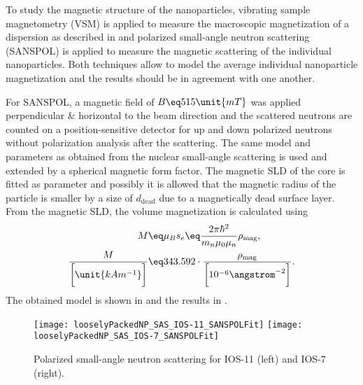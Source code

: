 \documentclass[\main/dresen_thesis.tex]{subfiles}
\begin{document}
  To study the magnetic structure of the nanoparticles, vibrating sample magnetometry (VSM) is applied to measure the macroscopic magnetization of a dispersion as described in  and polarized small-angle neutron scattering (SANSPOL) is applied to measure the magnetic scattering of the individual nanoparticles.
  Both techniques allow to model the average individual nanoparticle magnetization and the results should be in agreement with one another.

  For SANSPOL, a magnetic field of $B\eq 515 \unit{mT}$ was applied perpendicular \& horizontal to the beam direction and the scattered neutrons are counted on a position-sensitive detector for up and down polarized neutrons without polarization analysis after the scattering.
  The same model and parameters as obtained from the nuclear small-angle scattering is used and extended by a spherical magnetic form factor.
  The magnetic SLD of the core is fitted as parameter and possibly it is allowed that the magnetic radius of the particle is smaller by a size of $d_\mathrm{dead}$ due to a magnetically dead surface layer.
  From the magnetic SLD, the volume magnetization is calculated using 
  \begin{align}
    \label{eq:looselyPackedNP:nanoparticles:SLDtoMagnetization}
    M \eq& \mu_B s_e \eq \frac{2 \pi \hbar^2}{m_n \mu_0 \mu_n} \rho_\mathrm{mag},\\
    \frac{M}{\bigg[\unit{kA m^{-1}}\bigg]} \eq& 343.592 \cdot \frac{\rho_\mathrm{mag}}{\bigg[10^{-6} \angstrom^{-2} \bigg]}.
  \end{align}
  The obtained model is shown in  and the results in .

  \begin{figure}[tb]
    \centering
    \texttt{[image: looselyPackedNP\_SAS\_IOS-11\_SANSPOLFit]}
    \texttt{[image: looselyPackedNP\_SAS\_IOS-7\_SANSPOLFit]}
    \caption{\label{fig:looselyPackedNP:nanoparticle:sanspol}Polarized small-angle neutron scattering for IOS-11 (left) and IOS-7 (right).}
  \end{figure}
\end{document}
